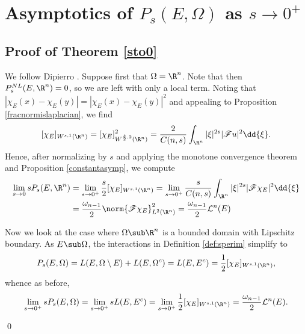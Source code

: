 \documentclass[../main.tex]{subfiles}
\begin{document}
\section{Asymptotics of $ P_{s}(E,\Omega) $ as $ s\to0^{+} $}

\subsection*{Proof of Theorem \ref{sto0}}
    We follow Dipierro \cite{dipierro:2013}. Suppose first that $ \Omega = \R^{n} $. Note that then $ P_{s}^{NL}(E,\R^{n}) = 0 $, so we are left with only a local term. Noting that $ | \chi_{E}(x) - \chi_{E}(y)| = | \chi_{E}(x) - \chi_{E}(y)|^{2} $ and appealing to Proposition \ref{fracnormislaplacian}, we find
    \[
        [\chi_{E}]_{W^{s,1}(\R^{n})} = [ \chi_{E} ]_{W^{\frac{s}{2},2}(\R^{n})}^{2} = \frac{2}{C(n,s)}\int_{\R^{n}}| \xi|^{2s}|\mathscr{F}u|^{2}\dd{\xi}.
    \] 
    Hence, after normalizing by $ s $ and applying the monotone convergence theorem and Proposition \ref{constantasymp}, we compute
    \begin{align*}
        \lim_{s\to 0} s P_{s}(E,\R^{n}) &= \lim_{s\to 0^{+}} \frac{s}{2}[ \chi_{E}]_{W^{s,1}(\R^{n})} = \lim_{s\to 0^{+}} \frac{s}{C(n,s)}\int_{\R^{n}}| \xi|^{2s}|\mathscr{F}\chi_{E}|^{2} \dd{\xi} \\
        &= \frac{\omega_{n-1}}{2} \norm{\mathscr{F} \chi_{E}}_{L^{2}(\R^{n})}^{2} = \frac{\omega_{n-1}}{2} \mathcal{L}^{n}(E)
    \end{align*}

    Now we look at the case where $ \Omega\sub \R^{n} $ is a bounded domain with Lipschitz boundary. As $ E\sub \Omega $, the interactions in Definition \ref{def:sperim} simplify to 
    \[
        P_{s}(E,\Omega) = L(E, \Omega\setminus E) + L(E, \Omega^{c}) = L(E,E^{c}) = \frac{1}{2}[ \chi_{E}]_{W^{s,1}(\R^{n})},
    \]
    whence as before,
    \[
        \lim_{s\to0^{+}}sP_{s}(E,\Omega) = \lim_{s\to0^{+}} sL(E,E^{c}) = \lim_{s\to0^{+}}\frac{1}{2}[ \chi_{E}]_{W^{s,1}(\R^{n})} = \frac{\omega_{n-1}}{2}\mathcal{L}^{n}(E).
    \]

    \qed
\end{document}
